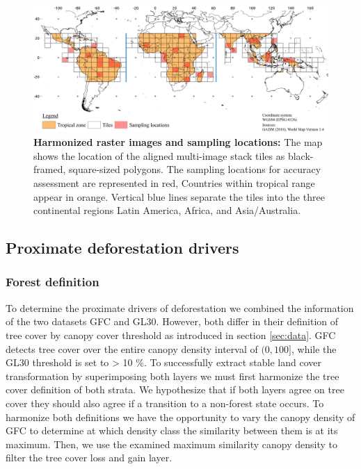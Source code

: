 		\begin{figure}[!ht]
			\centering
			\includegraphics[scale=.96]{img/method_overview_frameless}
			\caption[Harmonized raster images and sampling locations]{\textbf{Harmonized raster images and sampling locations:} The map shows the location of the aligned multi-image stack tiles as black-framed, square-sized polygons. The sampling locations for accuracy assessment are represented in red, Countries within tropical range appear in orange. Vertical blue lines separate the tiles into the three continental regions Latin America, Africa, and Asia/Australia.}
			\label{fig:aligned_tiles}
		\end{figure}

	\subsection{Proximate deforestation drivers} 
		\subsubsection{Forest definition}
			To determine the proximate drivers of deforestation we combined the information of the two datasets \ac{GFC} and \ac{GL30}. However, both differ in their definition of tree cover by canopy cover threshold as introduced in section \ref{sec:data}. \ac{GFC} detects tree cover over the entire canopy density interval of $(0,100]$, while the \ac{GL30} threshold is set to > 10 \%. To successfully extract stable land cover transformation by superimposing both layers we must first harmonize the tree cover definition of both strata. We hypothesize that if both layers agree on tree cover they should also agree if a transition to a non-forest state occurs. To harmonize both definitions we have the opportunity to vary the canopy density of \ac{GFC} to determine at which density class the similarity between them is at its maximum. Then, we use the examined maximum similarity canopy density to filter the tree cover loss and gain layer.


